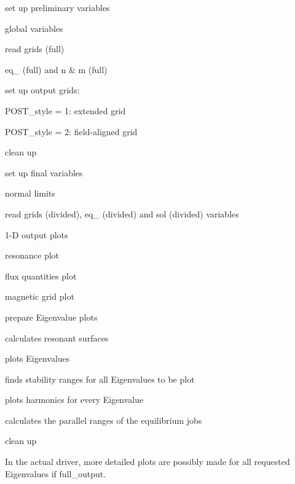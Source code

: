 \begin{DoxyItemize}
\item set up preliminary variables
\begin{DoxyItemize}
\item global variables
\item read grids (full)
\item {\ttfamily eq\+\_} (full) and {\ttfamily n} \& {\ttfamily m} (full)
\end{DoxyItemize}
\item set up output grids\+:
\begin{DoxyItemize}
\item {\ttfamily  P\+O\+S\+T\+\_\+style = 1}\+: extended grid
\item {\ttfamily  P\+O\+S\+T\+\_\+style = 2}\+: field-\/aligned grid
\end{DoxyItemize}
\item clean up
\item set up final variables
\begin{DoxyItemize}
\item normal limits
\item read grids (divided), {\ttfamily eq\+\_} (divided) and {\ttfamily sol} (divided) variables
\end{DoxyItemize}
\item 1-\/D output plots
\begin{DoxyItemize}
\item resonance plot
\item flux quantities plot
\item magnetic grid plot
\end{DoxyItemize}
\item prepare Eigenvalue plots
\begin{DoxyItemize}
\item calculates resonant surfaces
\item plots Eigenvalues
\item finds stability ranges for all Eigenvalues to be plot
\item plots harmonics for every Eigenvalue
\item calculates the parallel ranges of the equilibrium jobs
\end{DoxyItemize}
\item clean up
\end{DoxyItemize}

In the actual driver, more detailed plots are possibly made for all requested Eigenvalues if {\ttfamily full\+\_\+output}.


